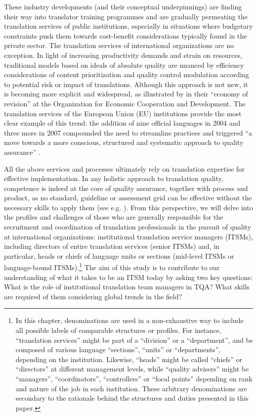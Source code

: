 \documentclass[output=paper]{langsci/langscibook}
\begin{document}
These industry developments (and their conceptual underpinnings) are finding their way into translator training programmes and are gradually permeating the translation services of public institutions, especially in situations where budgetary constraints push them towards cost-benefit considerations typically found in the private sector. The translation services of international organizations are no exception. In light of increasing productivity demands and strain on resources, traditional models based on ideals of absolute quality are nuanced by efficiency considerations of content prioritization and quality control modulation according to potential risk or impact of translations. Although this approach is not new, it is becoming more explicit and widespread, as illustrated by \citet{Prioux2007} in their “economy of revision” at the Organization for Economic Cooperation and Development. The translation services of the European Union (EU) institutions provide the most clear example of this trend: the addition of nine official languages in 2004 and three more in 2007 compounded the need to streamline practices and triggered “a move towards a more conscious, structured and systematic approach to quality assurance” \citep{Strandvikforthcoming}.



All the above services and processes ultimately rely on translation expertise for effective implementation. In any holistic approach to translation quality, competence is indeed at the core of quality assurance, together with process and product, as no standard, guideline or assessment grid can be effective without the necessary skills to apply them (see e.g. \citealt[20]{PrietoRamos2015}). From this perspective, we will delve into the profiles and challenges of those who are generally responsible for the recruitment and coordination of translation professionals in the pursuit of quality at international organizations: institutional translation service managers (ITSMs), including directors of entire translation services (senior ITSMs) and, in particular, heads or chiefs of language units or sections (mid-level ITSMs or language-bound ITSMs).\footnote{In this chapter, denominations are used in a non-exhaustive way to include all possible labels of comparable structures or profiles. For instance, “translation services” might be part of a “division” or a “department”, and be composed of various language “sections”, “units” or “departments”, depending on the institution. Likewise, “heads” might be called “chiefs” or “directors” at different management levels, while “quality advisers” might be “managers”, “coordinators”, “controllers” or “focal points” depending on rank and nature of the job in each institution. These arbitrary denominations are secondary to the rationale behind the structures and duties presented in this paper.} The aim of this study is to contribute to our understanding of what it takes to be an ITSM today by asking two key questions: What is the role of institutional translation team managers in TQA? What skills are required of them considering global trends in the field? 
\end{document}
